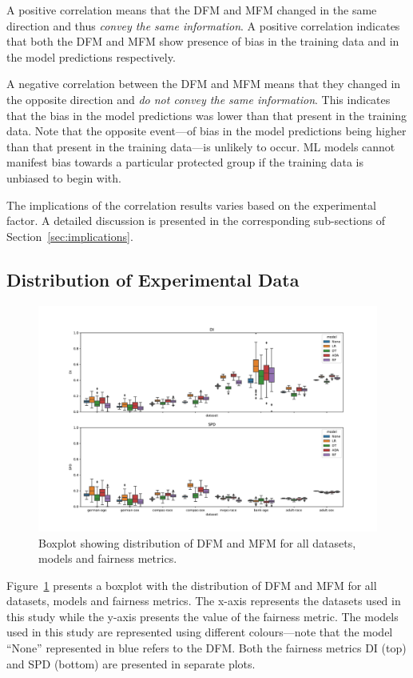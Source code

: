 \documentclass[sigconf,review,anonymous]{acmart}
\begin{document}
A positive correlation means that the DFM and MFM changed in the same
direction and thus \emph{convey the same information}. A positive
correlation indicates that both the DFM and MFM show presence of bias
in the training data and in the model predictions respectively.

A negative correlation between the DFM and MFM means that they changed
in the opposite direction and \emph{do not convey the same
information}. This indicates that the bias in the model predictions
was lower than that present in the training data. Note that the
opposite event---of bias in the model predictions being higher than
that present in the training data---is unlikely to occur. ML models
cannot manifest bias towards a particular protected group if the
training data is unbiased to begin with.

The implications of the correlation results varies based on the
experimental factor. A detailed discussion is presented in the
corresponding sub-sections of Section \ref{sec:implications}.

\subsection{Distribution of Experimental Data}\label{sec:data-analysis}

\begin{figure}
  \centering
  \includegraphics[width=\linewidth]{boxplot--dataset--di-spd--exp-full.pdf}
  \caption{Boxplot showing distribution of DFM and MFM for all
    datasets, models and fairness metrics.}
  \label{fig:boxplot--dataset--di-spd--exp-full}
\end{figure}

Figure \ref{fig:boxplot--dataset--di-spd--exp-full} presents a boxplot
with the distribution of DFM and MFM for all datasets, models and
fairness metrics. The x-axis represents the datasets used in this
study while the y-axis presents the value of the fairness metric. The
models used in this study are represented using different
colours---note that the model ``None'' represented in blue refers to
the DFM. Both the fairness metrics DI (top) and SPD (bottom) are
presented in separate plots.
\end{document}
